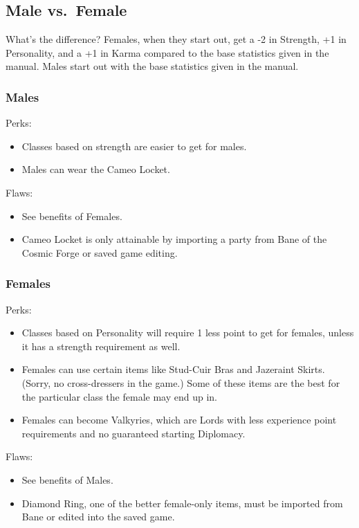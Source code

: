 \documentclass[12pt]{article}
\providecommand{\tightlist}{%
  \setlength{\itemsep}{0pt}\setlength{\parskip}{0pt}}
\newcommand{\indexClass}[1]{\index{#1}}
\newcommand{\class}[1]{#1\indexClass{#1}}
\newcommand{\WviiTwoColumnSetup}{\raggedcolumns\RaggedRight}
\begin{document}
\subsection{Male vs.~Female}\label{male-vs.female}

What's the difference? Females, when they start out, get a -2 in
Strength, +1 in Personality, and a +1 in Karma compared to the base
statistics given in the manual. Males start out with the base statistics
given in the manual.

\subsubsection{Males}\label{males}

\begin{multicols}{2}\WviiTwoColumnSetup
Perks:

\begin{itemize}
\tightlist
\item
  Classes based on strength are easier to get for males.
\item
  Males can wear the Cameo Locket.
\end{itemize}
\columnbreak

Flaws:

\begin{itemize}
\item
  See benefits of Females.
\item
  Cameo Locket is only attainable by importing a party from Bane of the
  Cosmic Forge or saved game editing.
\end{itemize}
\end{multicols}

\subsubsection{Females}\label{females}

\begin{multicols}{2}\WviiTwoColumnSetup
Perks:

\begin{itemize}
\tightlist
\item
  Classes based on Personality will require 1 less point to get for
  females, unless it has a strength requirement as well.
\item
  Females can use certain items like Stud-Cuir Bras and Jazeraint
  Skirts. (Sorry, no cross-dressers in the game.) Some of these items
  are the best for the particular class the female may end up in.
\item
  Females can become \class{Valkyrie}s, which are \class{Lord}s with less
  experience point requirements and no guaranteed starting Diplomacy.
\end{itemize}
\columnbreak

Flaws:

\begin{itemize}
\item
  See benefits of Males.
\item
  Diamond Ring, one of the better female-only items, must be imported
  from Bane or edited into the saved game.
\end{itemize}
\end{multicols}
\end{document}
